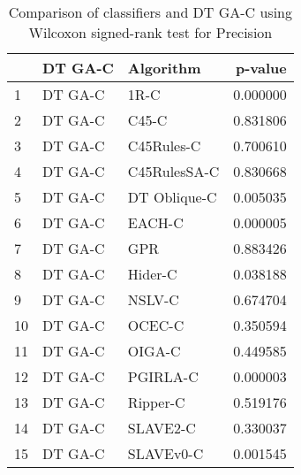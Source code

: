 \begin{table}
\footnotesize
\caption{Comparison of classifiers and DT GA-C using Wilcoxon signed-rank test for Precision}
\label{tab:DT GA-C wilcoxon Precision comparison}
\begin{tabular}{lllr}
\hline
 & DT GA-C & Algorithm & p-value \\
\hline
1 & DT GA-C & 1R-C & 0.000000 \\
2 & DT GA-C & C45-C & 0.831806 \\
3 & DT GA-C & C45Rules-C & 0.700610 \\
4 & DT GA-C & C45RulesSA-C & 0.830668 \\
5 & DT GA-C & DT Oblique-C & 0.005035 \\
6 & DT GA-C & EACH-C & 0.000005 \\
7 & DT GA-C & GPR & 0.883426 \\
8 & DT GA-C & Hider-C & 0.038188 \\
9 & DT GA-C & NSLV-C & 0.674704 \\
10 & DT GA-C & OCEC-C & 0.350594 \\
11 & DT GA-C & OIGA-C & 0.449585 \\
12 & DT GA-C & PGIRLA-C & 0.000003 \\
13 & DT GA-C & Ripper-C & 0.519176 \\
14 & DT GA-C & SLAVE2-C & 0.330037 \\
15 & DT GA-C & SLAVEv0-C & 0.001545 \\
\hline
\end{tabular}
\end{table}
